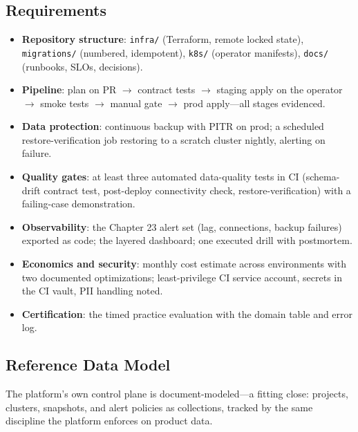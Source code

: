 \subsection*{Requirements}
\begin{itemize}
    \item \textbf{Repository structure}: \texttt{infra/} (Terraform, remote locked state), \texttt{migrations/} (numbered, idempotent), \texttt{k8s/} (operator manifests), \texttt{docs/} (runbooks, SLOs, decisions).
    \item \textbf{Pipeline}: plan on PR $\to$ contract tests $\to$ staging apply on the operator $\to$ smoke tests $\to$ manual gate $\to$ prod apply---all stages evidenced.
    \item \textbf{Data protection}: continuous backup with PITR on prod; a scheduled restore-verification job restoring to a scratch cluster nightly, alerting on failure.
    \item \textbf{Quality gates}: at least three automated data-quality tests in CI (schema-drift contract test, post-deploy connectivity check, restore-verification) with a failing-case demonstration.
    \item \textbf{Observability}: the Chapter 23 alert set (lag, connections, backup failures) exported as code; the layered dashboard; one executed drill with postmortem.
    \item \textbf{Economics and security}: monthly cost estimate across environments with two documented optimizations; least-privilege CI service account, secrets in the CI vault, PII handling noted.
    \item \textbf{Certification}: the timed practice evaluation with the domain table and error log.
\end{itemize}

\subsection*{Reference Data Model}
The platform's own control plane is document-modeled---a fitting close: projects, clusters, snapshots, and alert policies as collections, tracked by the same discipline the platform enforces on product data.

